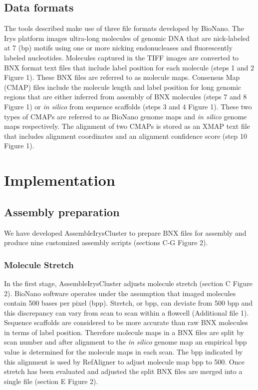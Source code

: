 \documentclass{bmcart}
\begin{document}
\subsection*{Data formats}
The tools described make use of three file formats developed by BioNano. The Irys platform images ultra-long molecules of genomic DNA that are nick-labeled at 7 (bp) motifs using one or more nicking endonucleases and fluorescently labeled nucleotides. Molecules captured in the TIFF images are converted to BNX format text files that include label position for each molecule (steps 1 and 2 Figure 1). These BNX files are referred to as molecule maps. Consensus Map (CMAP) files include the molecule length and label position for long genomic regions that are either inferred from assembly of BNX molecules (steps 7 and 8 Figure 1) or \textit{in silico} from sequence scaffolds (steps 3 and 4 Figure 1). These two types of CMAPs are referred to as BioNano genome maps and \textit{in silico} genome maps respectively. The alignment of two CMAPs is stored as an XMAP text file that includes alignment coordinates and an alignment confidence score (step 10 Figure 1).

\section*{Implementation}
\subsection*{Assembly preparation}
We have developed AssembleIrysCluster to prepare BNX files for assembly and produce nine customized assembly scripts (sections C-G Figure 2).
\subsubsection*{Molecule Stretch}
In the first stage, AssembleIrysCluster adjusts molecule stretch (section C Figure 2). BioNano software operates under the assumption that imaged molecules contain 500 bases per pixel (bpp). Stretch, or bpp, can deviate from 500 bpp and this discrepancy can vary from scan to scan within a flowcell (Additional file 1). Sequence scaffolds are considered to be more accurate than raw BNX molecules in terms of label position. Therefore molecule maps in a BNX files are split by scan number and after alignment to the \textit{in silico} genome map an empirical bpp value is determined for the molecule maps in each scan. The bpp indicated by this alignment is used by RefAligner to adjust molecule map bpp to 500. Once stretch has been evaluated and adjusted the split BNX files are merged into a single file (section E Figure 2).
\end{document}
